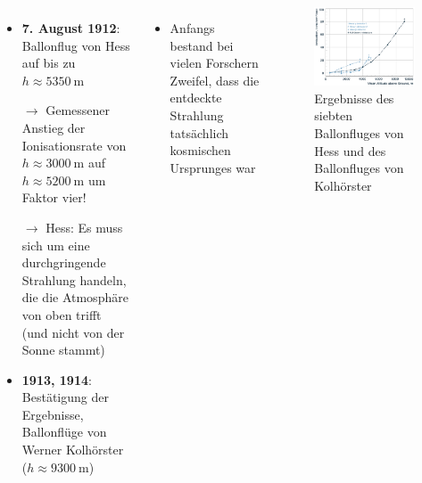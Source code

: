 \documentclass[aspectratio=1610, professionalfonts, 9pt, hyperref={colorlinks=false}]{beamer}
\begin{document}
\begin{frame}{}
  \begin{columns}
      \begin{itemize}
        \setlength\itemsep{0.5em}
        \item \textbf{7. August 1912}: Ballonflug von Hess auf bis zu $h \approx \SI{5350}{\metre}$
        \item [$\rightarrow$] Gemessener Anstieg der Ionisationsrate von $h \approx \SI{3000}{\metre}$ auf $h \approx \SI{5200}{\metre}$ um Faktor vier!
        \item [$\rightarrow$] Hess: Es muss sich um eine durchgringende Strahlung handeln, die die Atmosphäre von oben trifft (und nicht von der Sonne stammt)
        \item \textbf{1913, 1914}: Bestätigung der Ergebnisse, Ballonflüge von Werner Kolhörster ($h \approx \SI{9300}{\metre}$)
      \end{itemize}


      \begin{itemize}
        \item Anfangs bestand bei vielen Forschern Zweifel, dass die entdeckte Strahlung tatsächlich kosmischen Ursprunges war
      \end{itemize}


      \begin{figure}
          \centering
          \includegraphics[width=\linewidth]{images/walter2.png}
          \caption{Ergebnisse des siebten Ballonfluges von Hess und des Ballonfluges von Kolhörster \cite{Hess:2018twh}}
      \end{figure}
  \end{columns}
\end{frame}

\begin{frame}
\printbibliography
\end{frame}
\end{document}
